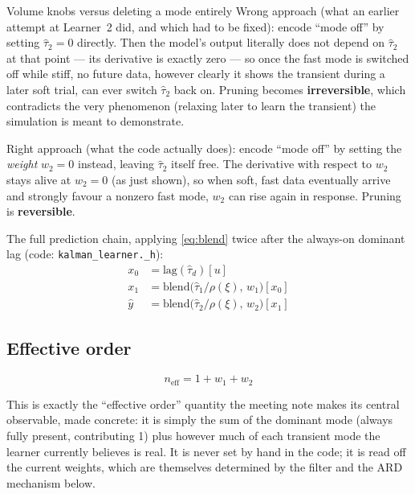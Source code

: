 \documentclass[11pt,a4paper]{article}
\newcommand{\neff}{n_{\mathrm{eff}}}
\begin{document}
\begin{examplebox}{Volume knobs versus deleting a mode entirely}
Wrong approach (what an earlier attempt at Learner~2 did, and which had to be
fixed): encode ``mode off'' by setting $\hat\tau_2=0$ directly. Then the
model's output literally does not depend on $\hat\tau_2$ at that point ---
its derivative is exactly zero --- so once the fast mode is switched off while
stiff, no future data, however clearly it shows the transient during a later
soft trial, can ever switch $\hat\tau_2$ back on. Pruning becomes
\textbf{irreversible}, which contradicts the very phenomenon (relaxing later
to learn the transient) the simulation is meant to demonstrate.

Right approach (what the code actually does): encode ``mode off'' by setting
the \emph{weight} $w_2=0$ instead, leaving $\hat\tau_2$ itself free. The
derivative with respect to $w_2$ stays alive at $w_2=0$ (as just shown), so
when soft, fast data eventually arrive and strongly favour a nonzero fast
mode, $w_2$ can rise again in response. Pruning is \textbf{reversible}.
\end{examplebox}

The full prediction chain, applying \eqref{eq:blend} twice after the always-on
dominant lag (code: \texttt{kalman\_learner.\_h}):
\begin{align}
x_0 &= \mathrm{lag}(\hat\tau_d)[u] \nonumber\\
x_1 &= \mathrm{blend}\bigl(\hat\tau_1/\rho(\xi),\, w_1\bigr)[x_0] \nonumber\\
\hat y &= \mathrm{blend}\bigl(\hat\tau_2/\rho(\xi),\, w_2\bigr)[x_1]
\label{eq:chain2}
\end{align}

\subsection{Effective order}

\begin{equation}
\boxed{\;\neff = 1 + w_1 + w_2\;}
\label{eq:neff}
\end{equation}

This is exactly the ``effective order'' quantity the meeting note makes its
central observable, made concrete: it is simply the sum of the dominant mode
(always fully present, contributing 1) plus however much of each transient
mode the learner currently believes is real. It is never set by hand in the
code; it is read off the current weights, which are themselves determined by
the filter and the ARD mechanism below.
\end{document}
